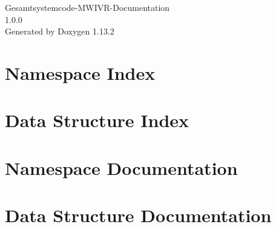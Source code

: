 \documentclass[twoside]{book}
\newcommand{\+}{\discretionary{\mbox{\scriptsize$\hookleftarrow$}}{}{}}
\newcommand{\clearemptydoublepage}{%
    \newpage{\pagestyle{empty}\cleardoublepage}%
  }
\begin{document}
  \raggedbottom
    \hypersetup{pageanchor=false,
                bookmarksnumbered=true,
                pdfencoding=unicode
               }
  \begin{titlepage}
  \vspace*{7cm}
  \begin{center}%
  {\Large Gesamtsystemcode-\/\+MWIVR-\/\+Documentation}\\
  [1ex]\large 1.\+0.\+0 \\
  \vspace*{1cm}
  {\large Generated by Doxygen 1.13.2}\\
  \end{center}
  \end{titlepage}
  \clearemptydoublepage
  \tableofcontents
  \clearemptydoublepage
  \hypersetup{pageanchor=true}

\chapter{Namespace Index}

\chapter{Data Structure Index}

\chapter{Namespace Documentation}

\chapter{Data Structure Documentation}

  \backmatter
  \newpage
  \clearemptydoublepage
  \printindex
\end{document}

